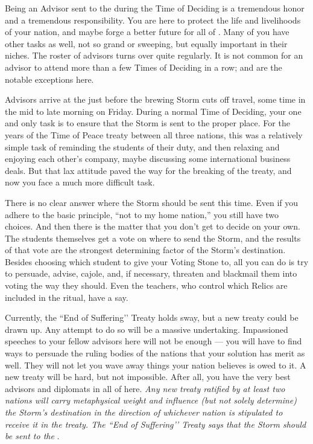 \documentclass[blue]{GL2020}
\begin{document}
\name{\bAdvisorBlue{}}

Being an Advisor sent to the \pSchool{} during the Time of Deciding is a tremendous honor and a tremendous responsibility. You are here to protect the life and livelihoods of your nation, and maybe forge a better future for all of \pEarth{}. Many of you have other tasks as well, not so grand or sweeping, but equally important in their niches. The roster of advisors turns over quite regularly. It is not common for an advisor to attend more than a few Times of Deciding in a row; \cDiplomat{\full} and \cHeadDiplomat{\full} are the notable exceptions here.

Advisors arrive at the \pSc{} just before the brewing Storm cuts off travel, some time in the mid to late morning on Friday. During a normal Time of Deciding, your one and only task is to ensure that the Storm is sent to the proper place. For the years of the Time of Peace treaty between all three nations, this was a relatively simple task of reminding the students of their duty, and then relaxing and enjoying each other’s company, maybe discussing some international business deals. But that lax attitude paved the way for the breaking of the treaty, and now you face a much more difficult task.

There is no clear answer where the Storm should be sent this time. Even if you adhere to the basic principle, ``not to my home nation,'' you still have two choices. And then there is the matter that you don't get to decide on your own. The students themselves get a vote on where to send the Storm, and the results of that vote are the strongest determining factor of the Storm’s destination. Besides choosing which student to give your Voting Stone to, all you can do is try to persuade, advise, cajole, and, if necessary, threaten and blackmail them into voting the way they should. Even the teachers, who control which Relics are included in the ritual, have a say.

Currently, the ``End of Suffering’’ Treaty holds sway, but a new treaty could be drawn up. Any attempt to do so will be a massive undertaking. Impassioned speeches to your fellow advisors here will not be enough — you will have to find ways to persuade the ruling bodies of the nations that your solution has merit as well. They will not let you wave away things your nation believes is owed to it. A new treaty will be hard, but not impossible. After all, you have the very best advisors and diplomats in all of \pEarth{} here. \emph{Any new treaty ratified by at least two nations will carry metaphysical weight and influence (but not solely determine) the Storm’s destination in the direction of whichever nation is stipulated to receive it in the treaty. The ``End of Suffering’’ Treaty says that the Storm should be sent to the \pShippies{}}.
\end{document}
